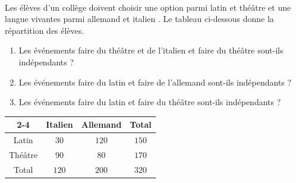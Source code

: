\documentclass[main.tex]{subfiles}
\begin{document}
\begin{exercise} \label{chapter02:exercise:C07}\hfill \\
	Les élèves d'un collège doivent choisir une option parmi \og latin \fg{} et  \og théâtre \fg{} et une langue vivantes parmi \og allemand \fg{} et \og italien \fg{}. Le tableau ci-dessous donne la répartition des élèves.\smallskip\\
	\noindent\parbox{0.6\linewidth}{ 
		\begin{enumerate}[leftmargin=*,label=\arabic*)]
			\item Les événements \og faire du théâtre et de l'italien \fg{} et \og faire du théâtre \fg{} sont-ils indépendants ? 
			\item Les événements \og faire du latin \fg{} et \og faire de l'allemand \fg{} sont-ils indépendants ? 
			\item Les événements \og faire du latin \fg{} et \og faire du théâtre \fg{} sont-ils indépendants ? 
		\end{enumerate}
	}\hfill 
	\parbox{0.38\linewidth}{ 
		\begin{tabular}{|c|c|c|c|}
			\cline{2-4} \multicolumn{1}{c|}{} & Italien & Allemand & Total \\\hline
			Latin & $30$ & $120$ & $150$ \\\hline 
			Théâtre & $90$ & $80$ & $170$ \\\hline 
			Total & $120$ & $200$ & $320$ \\\hline 
		\end{tabular}
	}  \smallskip
\end{exercise}
\newpage
\end{document}
